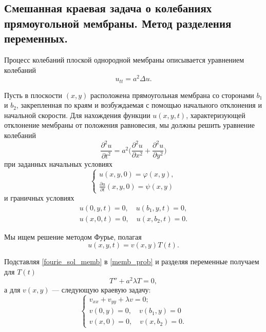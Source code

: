 \subsection{Смешанная краевая задача о колебаниях прямоугольной мембраны. Метод разделения переменных.}

Процесс колебаний плоской однородной мембраны описывается уравнением колебаний 
\begin{equation} \label{memb_prob}
	u_{tt} = a^2 \Delta u.
\end{equation}

Пусть в плоскости $(x, y)$ расположена прямоугольная мембрана со сторонами $b_1$ и $b_2$, закрепленная по краям и возбуждаемая с помощью начального отклонения и начальной скорости. Для нахождения функции $u(x, y, t)$, характеризующей отклонение мембраны от положения равновесия, мы должны решить уравнение колебаний 
\begin{equation}
	\tag{77'}
	\frac{\partial^2 u}{\partial t^2} = a^2 \Bigg(\frac{\partial^2 u}{\partial x^2} + \frac{\partial^2 u}{\partial y^2}\Bigg)
\end{equation}
при заданных начальных условиях 
\begin{equation} \label{init_cond_memb}
	\begin{cases}
		u(x, y, 0) = \varphi(x, y), \\
		\frac{\partial u}{\partial t}(x, y, 0) = \psi(x, y)
	\end{cases}
\end{equation}
и граничных условиях
\begin{align}
	u(0, y, t) = 0, \quad u(b_1, y, t) = 0, \\
	u(x, 0, t) = 0, \quad u(x, b_2, t) = 0. \label{bord_cond_memb}
\end{align}

Мы ищем решение методом Фурье, полагая
\begin{equation} \label{fourie_sol_memb}
	u(x, y, t) = v(x, y) T(t).
\end{equation}

Подставляя \eqref{fourie_sol_memb} в \eqref{memb_prob} и разделяя переменные получаем для $T(t)$
\begin{equation}
	T'' + a^2 \lambda T = 0,
\end{equation}
а для $v(x, y)$ --- следующую краевую задачу:
\begin{equation}
	\begin{cases}
		v_{xx} + v_{yy} + \lambda v = 0; \\
		v(0, y) = 0, \quad v(b_1, y) = 0 \\
		v(x, 0) = 0, \quad v(x, b_2) = 0.
	\end{cases}
\end{equation}

